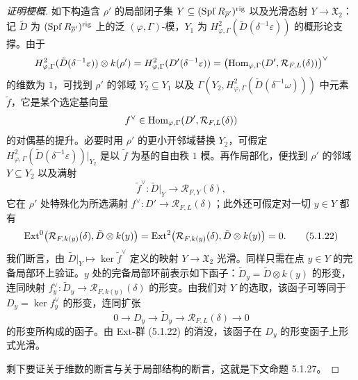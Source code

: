 \begin{proof}[证明梗概]
如下构造含 $\rho'$ 的局部闭子集 $Y\subseteq(\operatorname{Spf} R_{\overline{\rho}'})^{\mathrm{rig}}$ 以及光滑态射 $Y\to\mathfrak{X}_2$：记 $\tilde{D}$ 为 $(\operatorname{Spf} R_{\overline{\rho}'})^{\mathrm{rig}}$ 上的泛 $(\varphi,\Gamma)$-模，$Y_1$ 为 $H^2_{\varphi,\Gamma}(\tilde{D}(\delta^{-1}\varepsilon))$ 的概形论支撑。由于
\[
H^2_{\varphi,\Gamma}(\tilde{D}(\delta^{-1}\varepsilon))\otimes k(\rho')=H^2_{\varphi,\Gamma}(D'(\delta^{-1}\varepsilon))=\bigl(\operatorname{Hom}_{\varphi,\Gamma}(D',\mathcal{R}_{F,L}(\delta))\bigr)^\vee
\]
的维数为 $1$，可找到 $\rho'$ 的邻域 $Y_2\subseteq Y_1$ 以及 $\Gamma(Y_2,H^2_{\varphi,\Gamma}(\tilde{D}(\delta^{-1}\omega)))$ 中元素 $\tilde{f}$，它是某个选定基向量
\[
f^\vee\in\operatorname{Hom}_{\varphi,\Gamma}(D',\mathcal{R}_{F,L}(\delta))
\]
的对偶基的提升。必要时用 $\rho'$ 的更小开邻域替换 $Y_2$，可假定 $H^2_{\varphi,\Gamma}(\tilde{D}(\delta^{-1}\varepsilon))|_{Y_2}$ 是以 $\tilde{f}$ 为基的自由秩 $1$ 模。再作局部化，便找到 $\rho'$ 的邻域 $Y\subseteq Y_2$ 以及满射
\[
\tilde{f}^\vee:\tilde{D}|_Y\longrightarrow\mathcal{R}_{F,Y}(\delta),
\]
它在 $\rho'$ 处特殊化为所选满射 $f^\vee:D'\to\mathcal{R}_{F,L}(\delta)$；此外还可假定对一切 $y\in Y$ 都有
\begin{equation}
\operatorname{Ext}^0\bigl(\mathcal{R}_{F,k(y)}(\delta),\tilde{D}\otimes k(y)\bigr)=\operatorname{Ext}^2\bigl(\mathcal{R}_{F,k(y)}(\delta),\tilde{D}\otimes k(y)\bigr)=0.\tag{5.1.22}
\end{equation}
我们断言，由 $\tilde{D}|_Y\mapsto\ker\tilde{f}^\vee$ 定义的映射 $Y\to\mathfrak{X}_2$ 光滑。同样只需在点 $y\in Y$ 的完备局部环上验证。$y$ 处的完备局部环前表示如下函子：$\tilde{D}_y=\tilde{D}\otimes k(y)$ 的形变，连同映射 $f^\vee_y:\tilde{D}_y\to\mathcal{R}_{F,k(y)}(\delta)$ 的形变。由我们对 $Y$ 的选取，该函子可等同于 $D_y=\ker f^\vee_y$ 的形变，连同扩张
\[
0\longrightarrow D_y\longrightarrow\tilde{D}_y\longrightarrow\mathcal{R}_{F,L}(\delta)\longrightarrow0
\]
的形变所构成的函子。由 Ext-群 (5.1.22) 的消没，该函子在 $D_y$ 的形变函子上形式光滑。

剩下要证关于维数的断言与关于局部结构的断言，这就是下文命题 5.1.27。
\end{proof}


